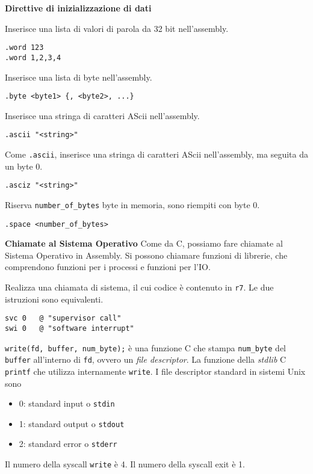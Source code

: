 \begin{defn}
\textbf{Direttive di inizializzazione di dati}

Inserisce una lista di valori di parola da 32 bit nell'assembly.
\begin{lstlisting}[style=arm]
.word 123
.word 1,2,3,4
\end{lstlisting}

Inserisce una lista di byte nell'assembly.
\begin{lstlisting}[style=arm]
.byte <byte1> {, <byte2>, ...}
\end{lstlisting}

Inserisce una stringa di caratteri AScii nell'assembly.
\begin{lstlisting}[style=arm]
.ascii "<string>"
\end{lstlisting}

Come \verb|.ascii|, inserisce una stringa di caratteri AScii nell'assembly, ma seguita da un byte 0.
\begin{lstlisting}[style=arm]
.asciz "<string>"
\end{lstlisting}

Riserva \verb|number_of_bytes| byte in memoria, sono riempiti con byte 0.
\begin{lstlisting}[style=arm]
.space <number_of_bytes>
\end{lstlisting}
\end{defn}

\begin{defn}
\textbf{Chiamate al Sistema Operativo}
Come da C, possiamo fare chiamate al Sistema Operativo in Assembly. Si possono chiamare funzioni di librerie, che comprendono funzioni per i processi e funzioni per l'IO.

Realizza una chiamata di sistema, il cui codice è contenuto in \verb|r7|. Le due istruzioni sono equivalenti.
\begin{lstlisting}[style=arm]
svc 0	@ "supervisor call"
swi 0	@ "software interrupt"
\end{lstlisting}
\end{defn}

\begin{exmp}
\verb|write(fd, buffer, num_byte);| è una funzione C che stampa \verb|num_byte| del \verb|buffer| all'interno di \verb|fd|, ovvero un \textit{file descriptor}. La funzione della \textit{stdlib} C \verb|printf| che utilizza internamente \verb|write|. I file descriptor standard in sistemi Unix sono
\begin{itemize}
	\item 0: standard input o \verb|stdin|
	\item 1: standard output o \verb|stdout|
	\item 2: standard error o \verb|stderr|
\end{itemize}

Il numero della syscall \verb|write| è 4. Il numero della syscall exit è 1.
\end{exmp}

